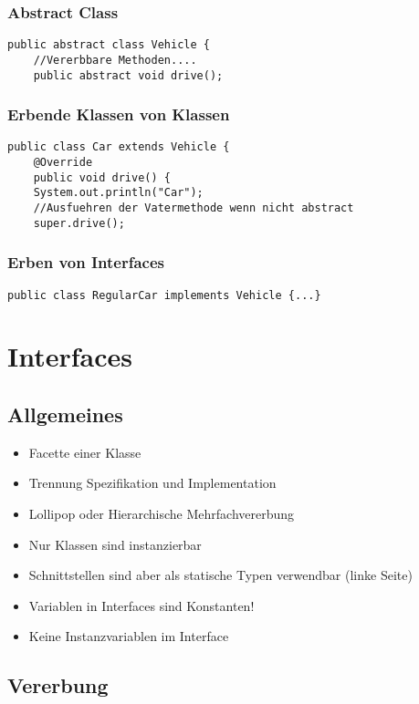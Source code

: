 \begin{multicols*}{5}
	\subsubsection{Abstract Class}
	\begin{lstlisting}
public abstract class Vehicle {
	//Vererbbare Methoden....
	public abstract void drive();
	\end{lstlisting}
	\subsubsection{Erbende Klassen von Klassen}
	\begin{lstlisting}
public class Car extends Vehicle {
	@Override
	public void drive() {
	System.out.println("Car");
	//Ausfuehren der Vatermethode wenn nicht abstract
	super.drive(); 
	\end{lstlisting}
	\subsubsection{Erben von Interfaces}
	\begin{lstlisting}
public class RegularCar implements Vehicle {...}
	\end{lstlisting}




\section{Interfaces}
	\subsection{Allgemeines}
	\begin{itemize}
		\item Facette einer Klasse
		\item Trennung Spezifikation und Implementation
		\item Lollipop oder Hierarchische Mehrfachvererbung
		\item Nur Klassen sind instanzierbar
		\item Schnittstellen sind aber als statische Typen verwendbar (linke Seite)
		\item Variablen in Interfaces sind Konstanten!
		\item Keine Instanzvariablen im Interface
	\end{itemize}
	\subsection{Vererbung}

\end{multicols*}
